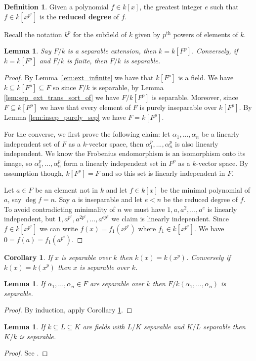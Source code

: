 \documentclass[12pt]{article}
\theoremstyle{plain}
\newtheorem{lemma}[thm]{Lemma}
\newtheorem{cor}[thm]{Corollary}
\theoremstyle{definition}
\newtheorem{defn}[thm]{Definition} %
\begin{document}
\begin{defn}
Given a polynomial $f \in k[x]$, the greatest integer $e$ such that $f \in k[x^{p^e}]$ is the \textbf{reduced degree} of $f$.
\end{defn}
Recall the notation $k^p$ for the subfield of $k$ given by $p^{\operatorname{th}}$ powers of elements of $k$.
\begin{lemma}
\label{lem:sep_ext_condition}
Say $F/k$ is a separable extension, then $k = k[F^p]$. Conversely, if $k = k[F^p]$ and $F/k$ is finite, then $F/k$ is separable.
\end{lemma}
\begin{proof}
By Lemma \ref{lem:ext_infinite} we have that $k[F^p]$ is a field. We have $k \subseteq k[F^p] \subseteq F$ so since $F/k$ is separable, by Lemma \ref{lem:sep_ext_trans_sort_of} we have $F/k[F^p]$ is separable. Moreover, since $F \subseteq k[F^p]$ we have that every element of $F$ is purely inseparable over $k[F^p]$. By Lemma \ref{lem:insep_purely_sep} we have $F = k[F^p]$.

For the converse, we first prove the following claim: let $\alpha_1,...,\alpha_n$ be a linearly independent set of $F$ as a $k$-vector space, then $\alpha_1^p,...,\alpha_n^p$ is also linearly independent. We know the Frobenius endomorphism is an isomorphism onto its image, so $\alpha_1^p,...,\alpha_n^p$ form a linearly independent set in $F^p$ as a $k$-vector space. By assumption though, $k[F^p] = F$ and so this set is linearly independent in $F$.

Let $a \in F$ be an element not in $k$ and let $f \in k[x]$ be the minimal polynomial of $a$, say $\operatorname{deg}f = n$. Say $a$ is inseparable and let $e < n$ be the reduced degree of $f$. To avoid contradicting minimality of $n$ we must have $1, a, a^2,..., a^e$ is linearly independent, but $1,a^{p^e},a^{2p^e},...,a^{ep^e}$ we claim is linearly independent. Since $f \in k[x^{p^e}]$ we can write $f(x) = f_1(x^{p^e})$ where $f_1 \in k[x^{p^e}]$. We have $0 = f(a) = f_1(a^{p^e})$.
\end{proof}
\begin{cor}
\label{cor:base_induct}
If $x$ is separable over $k$ then $k(x) = k(x^p)$. Conversely if $k(x) = k(x^p)$ then $x$ is separable over $k$.
\end{cor}
\begin{lemma}
\label{lem:generated}
If $\alpha_1,...,\alpha_n \in F$ are separable over $k$ then $F/k(\alpha_1,...,\alpha_n)$ is separable.
\end{lemma}
\begin{proof}
By induction, apply Corollary \ref{cor:base_induct}.
\end{proof}
%
\begin{lemma}
\label{lem:separable_ext_transitive} If $k \subseteq L \subseteq K$ are fields with $L/K$ separable and $K/L$ separable then $K/k$ is separable.
\end{lemma}
\begin{proof}
See \cite[II \S 5, 9]{Zariski}.
\end{proof}
\end{document}
